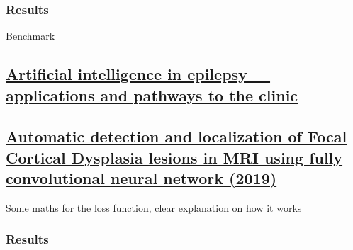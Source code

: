 \subsubsection{Results}

\begin{table}[htbp]
	\centering
	\caption{Benchmark}

	\caption{Results}
\end{table}

\subsection{\href{https://www.nature.com/articles/s41582-024-00965-9\#Sec21}{Artificial intelligence in epilepsy — applications and pathways to the clinic}}

\subsection{\href{https://www.sciencedirect.com/science/article/pii/S1746809419301211\#sec0010}{Automatic detection and localization of Focal Cortical Dysplasia lesions in MRI using fully convolutional neural network (2019)}}

Some maths for the loss function, clear explanation on how it works

\subsubsection{Results}

